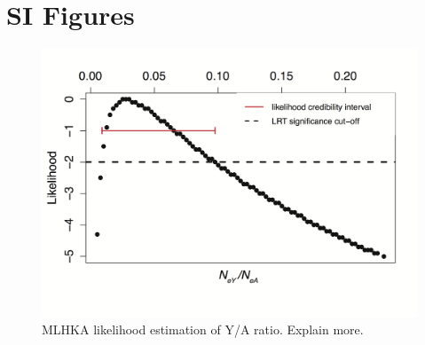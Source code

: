 \documentclass[9pt,onecolumn,twoside]{pnas-new}
\begin{document}
\section*{SI Figures}

\begin{figure}[tbhp!]
\centering
\includegraphics[width=.5\linewidth]{FigureS1.png}
\caption{MLHKA likelihood estimation of Y/A ratio. Explain more.}
\label{figure:FigureS1}
\end{figure}



\end{document}
